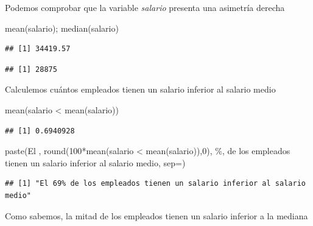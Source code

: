\documentclass[
]{book}
\newenvironment{Shaded}{\begin{snugshade}}{\end{snugshade}}
\newcommand{\AttributeTok}[1]{\textcolor[rgb]{0.77,0.63,0.00}{#1}}
\newcommand{\DecValTok}[1]{\textcolor[rgb]{0.00,0.00,0.81}{#1}}
\newcommand{\FunctionTok}[1]{\textcolor[rgb]{0.00,0.00,0.00}{#1}}
\newcommand{\NormalTok}[1]{#1}
\newcommand{\SpecialCharTok}[1]{\textcolor[rgb]{0.00,0.00,0.00}{#1}}
\newcommand{\StringTok}[1]{\textcolor[rgb]{0.31,0.60,0.02}{#1}}
\theoremstyle{break}
\begin{document}
Podemos comprobar que la variable \emph{salario} presenta una
asimetría derecha

\begin{Shaded}
\begin{Highlighting}[]
\FunctionTok{mean}\NormalTok{(salario); }\FunctionTok{median}\NormalTok{(salario)}
\end{Highlighting}
\end{Shaded}

\begin{verbatim}
## [1] 34419.57
\end{verbatim}

\begin{verbatim}
## [1] 28875
\end{verbatim}

Calculemos cuántos empleados tienen un salario inferior al salario medio

\begin{Shaded}
\begin{Highlighting}[]
\FunctionTok{mean}\NormalTok{(salario }\SpecialCharTok{\textless{}} \FunctionTok{mean}\NormalTok{(salario))}
\end{Highlighting}
\end{Shaded}

\begin{verbatim}
## [1] 0.6940928
\end{verbatim}

\begin{Shaded}
\begin{Highlighting}[]
\FunctionTok{paste}\NormalTok{(}\StringTok{\textquotesingle{}El \textquotesingle{}}\NormalTok{, }\FunctionTok{round}\NormalTok{(}\DecValTok{100}\SpecialCharTok{*}\FunctionTok{mean}\NormalTok{(salario }\SpecialCharTok{\textless{}} \FunctionTok{mean}\NormalTok{(salario)),}\DecValTok{0}\NormalTok{), }\StringTok{\textquotesingle{}\%\textquotesingle{}}\NormalTok{,}
      \StringTok{\textquotesingle{} de los empleados tienen un salario inferior al salario medio\textquotesingle{}}\NormalTok{, }\AttributeTok{sep=}\StringTok{\textquotesingle{}\textquotesingle{}}\NormalTok{)}
\end{Highlighting}
\end{Shaded}

\begin{verbatim}
## [1] "El 69% de los empleados tienen un salario inferior al salario medio"
\end{verbatim}

Como sabemos, la mitad de los empleados tienen un salario inferior a la mediana
\end{document}
